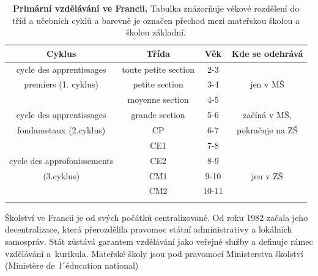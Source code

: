 \begin{spacing}{1.0}
\begin{table}[h]
	\small
	\begin{center}
	\begin{tabular}{|c|c|c|c|}
		\hline
		\rowcolor{grey}
		\textbf{Cyklus}				& \textbf{Třída}		& \textbf{Věk}	& \textbf{Kde se odehrává}	\\
		\hline
		\hline
		\rowcolor{grey!10}
		cycle des apprentissages	& toute petite section 	& 2-3 		&				\\ \rowcolor{grey!10}
		premiers (1. cyklus)		& petite section 		& 3-4 		& jen v MŠ 		\\ \rowcolor{grey!10}
									& moyenne section 		& 4-5 		& 				\\ \rowcolor{grey!10}
		\hline
		cycle des apprentissages 	& grande section 		& 5-6 		& začíná v MŠ, 		\\ \rowcolor{grey!10}
		fondametaux (2.cyklus) 		& CP 					& 6-7 		& pokračuje na ZŠ 	\\ \rowcolor{grey!10}
									& CE1 					& 7-8 		& 					\\ \rowcolor{grey!10}
		\hline
		cycle des approfonissements & CE2 					& 8-9 		&					\\ \rowcolor{grey!10}
		(3.cyklus)					& CM1 					& 9-10 		& jen v ZŠ 			\\ \rowcolor{grey!10}
									& CM2 					& 10-11 	& 					\\ \rowcolor{grey!10}
		\hline
	\end{tabular}
	\end{center}
	\caption{ \textbf{Primární vzdělávání ve Francii.} Tabulka znázorňuje věkové rozdělení do tříd a učebních cyklů a barevně je označen přechod mezi mateřskou školou a školou základní. 
	}
	\label{tab:rozdeleniTridCR}
\end{table}
\end{spacing}
		Školství ve Francii je od svých počátků centralizované. Od roku 1982 začala jeho decentralizace, která přerozdělila pravomoc státní administrativy a lokálních samospráv. Stát zůstává garantem vzdělávání jako veřejné služby a definuje rámec vzdělávání a kurikula. Mateřské školy jsou pod pravomocí Ministerstva školství (Ministère de l´éducation national)

